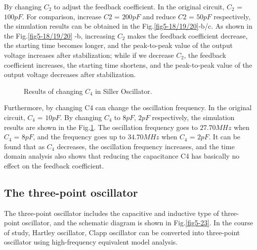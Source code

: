 \documentclass[conference]{IEEEtran}
\begin{document}
By changing $C_2$ to adjust the feedback coefficient. In the original circuit, $C_2$ = $100pF$. For comparison, increase $C2$ = $200pF$ and reduce $C2$ = $50pF$ respectively, the simulation results can be obtained in the Fig.\ref{fig5-18/19/20}-b/c. As shown in the Fig.\ref{fig5-18/19/20} -b, increasing $C_2$ makes the feedback coefficient decrease, the starting time becomes longer, and the peak-to-peak value of the output voltage increases after stabilization; while if we decrease $C_2$, the feedback coefficient increases, the starting time shortens, and the peak-to-peak value of the output voltage decreases after stabilization.

\begin{figure}[!h]
\centering
{}
\quad
{}
\caption{Results of changing $C_4$ in Siller Oscillator.}
\label{fig5-21/22}
\end{figure}

Furthermore, by changing C4 can change the oscillation frequency. In the original circuit, $C_4$ = $10pF$. By changing $C_4$ to $8pF$, $2pF$ respectively, the simulation results are shown in the Fig.\ref{fig5-21/22}. The oscillation frequency goes to $27.70MHz$ when $C_4$ = $8pF$, and the frequency goes up to $34.70MHz$ when $C_4$ = $2pF$. It can be found that as $C_4$ decreases, the oscillation frequency increases, and the time domain analysis also shows that reducing the capacitance C4 has basically no effect on the feedback coefficient.

\subsection{The three-point oscillator}
The three-point oscillator includes the capacitive and inductive type of three-point oscillator, and the schematic diagram is shown in Fig.\ref{fig5-23}. In the course of study, Hartley oscillator, Clapp oscillator can be converted into three-point oscillator using high-frequency equivalent model analysis. 
\end{document}
